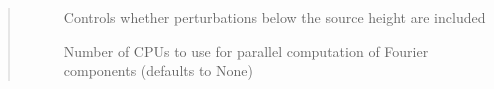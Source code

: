 \documentclass[letterpaper,10pt,english]{sphinxmanual}
\begin{document}
\begin{fulllineitems}
\begin{quote}
\begin{description}
\begin{description}
\item[{}] \leavevmode
Controls whether perturbations below the source height are included

\item[{}] \leavevmode
Number of CPUs to use for parallel computation of Fourier components (defaults to None)

\end{description}

\end{description}\end{quote}

\end{fulllineitems}

\end{document}
